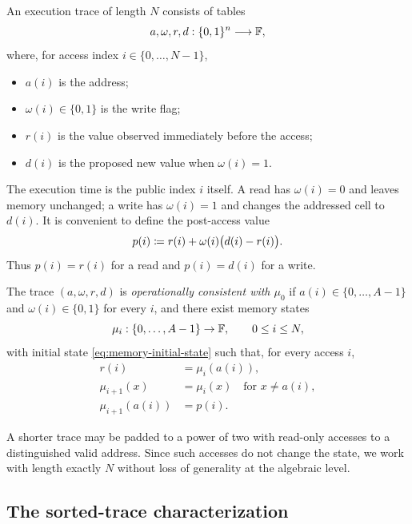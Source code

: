 An execution trace of length $N$ consists of tables
\begin{equation}
  a,\omega,r,d:\{0,1\}^n\longrightarrow\mathbb{F},
  \label{eq:memory-execution-tables}
\end{equation}
where, for access index $i\in\{0,\ldots,N-1\}$,
\begin{itemize}[leftmargin=*]
  \item $a(i)$ is the address;
  \item $\omega(i)\in\{0,1\}$ is the write flag;
  \item $r(i)$ is the value observed immediately before the access;
  \item $d(i)$ is the proposed new value when $\omega(i)=1$.
\end{itemize}
The execution time is the public index $i$ itself.  A read has $\omega(i)=0$ and leaves memory unchanged; a write has $\omega(i)=1$ and changes the addressed cell to $d(i)$.  It is convenient to define the post-access value
\begin{equation}
  p(i)
  \coloneqq
  r(i)+\omega(i)\bigl(d(i)-r(i)\bigr).
  \label{eq:memory-post-value}
\end{equation}
Thus $p(i)=r(i)$ for a read and $p(i)=d(i)$ for a write.

\begin{definition}
\label{def:memory-operational-consistency}
The trace $(a,\omega,r,d)$ is \emph{operationally consistent with $\mu_0$} if $a(i)\in\{0,\ldots,A-1\}$ and $\omega(i)\in\{0,1\}$ for every $i$, and there exist memory states
\[
  \mu_i:\{0,\ldots,A-1\}\to\mathbb{F},
  \qquad 0\le i\le N,
\]
with initial state \eqref{eq:memory-initial-state} such that, for every access $i$,
\begin{align}
  r(i)&=\mu_i(a(i)),
  \label{eq:memory-read-semantics}\\
  \mu_{i+1}(x)&=\mu_i(x)
       \quad\text{for }x\ne a(i),
  \label{eq:memory-other-cells}\\
  \mu_{i+1}(a(i))&=p(i).
  \label{eq:memory-address-update}
\end{align}
\end{definition}

A shorter trace may be padded to a power of two with read-only accesses to a distinguished valid address.  Since such accesses do not change the state, we work with length exactly $N$ without loss of generality at the algebraic level.

\subsection{The sorted-trace characterization}
\label{sec:memory-sorted-characterization}


